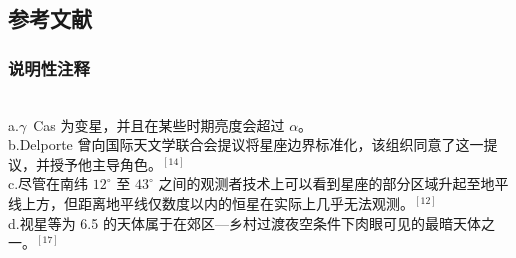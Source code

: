 \subsection{参考文献}  
\subsubsection{说明性注释} \\
a.$\gamma$~Cas 为变星，并且在某些时期亮度会超过 $\alpha$。\\
b.Delporte 曾向国际天文学联合会提议将星座边界标准化，该组织同意了这一提议，并授予他主导角色。$^{[14]}$\\  
c.尽管在南纬 $12^\circ$ 至 $43^\circ$ 之间的观测者技术上可以看到星座的部分区域升起至地平线上方，但距离地平线仅数度以内的恒星在实际上几乎无法观测。$^{[12]}$\\  
d.视星等为 6.5 的天体属于在郊区—乡村过渡夜空条件下肉眼可见的最暗天体之一。$^{[17]}$
